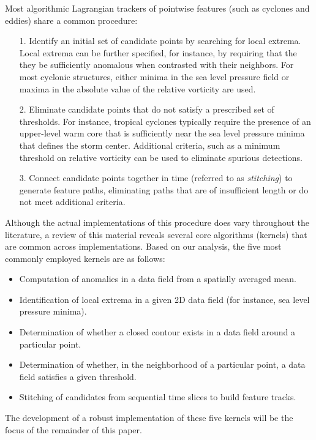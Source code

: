 \documentclass[gmdd, hvmath]{copernicus}
\begin{document}
Most algorithmic Lagrangian trackers of pointwise features (such as cyclones and eddies) share a common procedure:
\begin{itemize}
\item[1.] Identify an initial set of candidate points by searching for local extrema.  Local extrema can be further specified, for instance, by requiring that the they be sufficiently anomalous when contrasted with their neighbors.  For most cyclonic structures, either minima in the sea level pressure field or maxima in the absolute value of the relative vorticity are used.
\item[2.] Eliminate candidate points that do not satisfy a prescribed set of thresholds.  For instance, tropical cyclones typically require the presence of an upper-level warm core that is sufficiently near the sea level pressure minima that defines the storm center.  Additional criteria, such as a minimum threshold on relative vorticity can be used to eliminate spurious detections.  
\item[3.] Connect candidate points together in time (referred to as \textit{stitching}) to generate feature paths, eliminating paths that are of insufficient length or do not meet additional criteria.
\end{itemize}  Although the actual implementations of this procedure does vary throughout the literature, a review of this material reveals several core algorithms (kernels) that are common across implementations.  Based on our analysis, the five most commonly employed kernels are as follows:
\begin{itemize}
\item Computation of anomalies in a data field from a spatially averaged mean.
\item Identification of local extrema in a given 2D data field (for instance, sea level pressure minima).
\item Determination of whether a closed contour exists in a data field around a particular point.
\item Determination of whether, in the neighborhood of a particular point, a data field satisfies a given threshold.
\item Stitching of candidates from sequential time slices to build feature tracks.
\end{itemize}  The development of a robust implementation of these five kernels will be the focus of the remainder of this paper.
\end{document}
